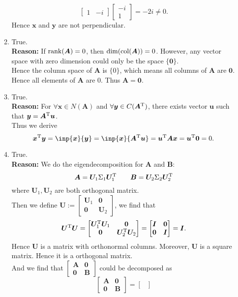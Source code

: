 \begin{enumerate}
\begin{enumerate}
\[\begin{bmatrix}
1&-i
\end{bmatrix}\begin{bmatrix}
-i\\1
\end{bmatrix}=-2i\ne0.
\]
Hence $\bm x$ and $\bm y$ are not perpendicular.
\item
True.\\
\textbf{Reason: }If $\operatorname{rank}(\bm A)=0$, then $\dim(\operatorname{col}(\bm A))=0$. However, any vector space with zero dimension could only be the space $\{\bm 0\}.$\\
Hence the column space of $\bm A$ is $\{0\}$, which means all columns of $\bm A$ are $\bm0.$ Hence all elements of $\bm A$ are 0. Thus $\bm A=\bm0.$
\item
True.\\
\textbf{Reason: }For $\forall\bm x\in N(\bm A)$ and $\forall\bm y\in C(\bm A^{\mathrm T})$, there exists vector $\bm u$ such that $\bm y=\bm A^{\mathrm T}\bm u$.\\
Thus we derive
\[
\bm x\trans\bm y=\inp{\bm x}{\bm y}=\inp{\bm x}{\bm A\trans\bm u}=\bm u\trans\bm A\bm x=\bm u\trans\bm 0=0.
\]
\item
True.\\
\textbf{Reason: }We do the eigendecomposition for $\bm A$ and $\bm B$:
\[
\bm A=\bm U_1\Sigma_1\bm U_1^{\mathrm T}\qquad
\bm B=\bm U_2\Sigma_2\bm U_2^{\mathrm T}
\]
where $\bm U_1,\bm U_2$ are both orthogonal matrix.\\
Then we define $\bm U:=\begin{bmatrix}
\bm U_1&\bm0\\\bm 0&\bm U_2
\end{bmatrix}$, we find that 
\[\bm U^{\mathrm T}\bm U=\begin{bmatrix}
\bm U_1^{\mathrm T}\bm U_1&\bm0\\\bm0&\bm U_2^{\mathrm T}\bm U_2
\end{bmatrix}=\begin{bmatrix}
\bm I&\bm0\\\bm0&\bm I
\end{bmatrix}=\bm I.\]
Hence $\bm U$ is a matrix with orthonormal columns. Moreover, $\bm U$ is a square matrix. Hence it is a orthogonal matrix.\\
And we find that $\begin{bmatrix}
\bm A&\bm0\\\bm0&\bm B
\end{bmatrix}$ could be decomposed as
\[
\begin{bmatrix}
\bm A&\bm0\\\bm0&\bm B
\end{bmatrix}=\begin{bmatrix}

\end{bmatrix}\]
\end{enumerate}
\end{enumerate}
